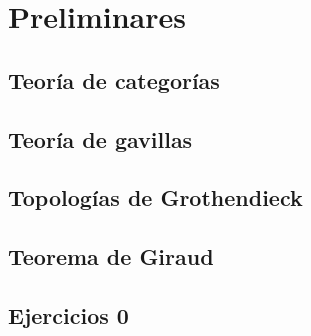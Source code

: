 \chapter{Preliminares}
\label{cap:0}

\section{Teoría de categorías}
\label{sec:0.1}

\section{Teoría de gavillas}
\label{sec:0.2}

\section{Topologías de Grothendieck}
\label{sec:0.3}

\section{Teorema de Giraud}
\label{sec:0.4}

\section*{Ejercicios 0}
\label{sec:ejercicios-0}
